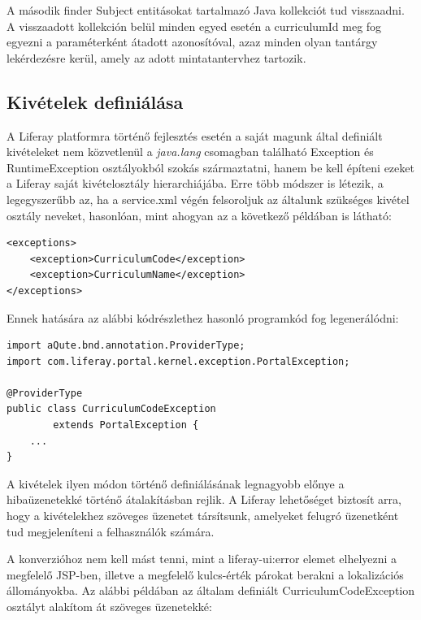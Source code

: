\documentclass[hidelinks, 12pt, a4paper]{report}
\begin{document}
A második finder Subject entitásokat tartalmazó Java kollekciót tud visszaadni. A visszaadott kollekción belül minden egyed esetén a curriculumId meg fog egyezni a paraméterként átadott azonosítóval, azaz minden olyan tantárgy lekérdezésre kerül, amely az adott mintatantervhez tartozik.

\subsection{Kivételek definiálása}

A Liferay platformra történő fejlesztés esetén a saját magunk által definiált kivételeket nem közvetlenül a \emph{java.lang} csomagban található Exception és RuntimeException osztályokból szokás származtatni, hanem be kell építeni ezeket a Liferay saját kivételosztály hierarchiájába. Erre több módszer is létezik, a legegyszerűbb az, ha a service.xml végén felsoroljuk az általunk szükséges kivétel osztály neveket, hasonlóan, mint ahogyan az a következő példában is látható:

\begin{minipage}{\linewidth}
\begin{lstlisting}
<exceptions>
	<exception>CurriculumCode</exception>
	<exception>CurriculumName</exception>
</exceptions>
\end{lstlisting}
\end{minipage}

Ennek hatására az alábbi kódrészlethez hasonló programkód fog legenerálódni:

\begin{minipage}{\linewidth}
\begin{lstlisting}
import aQute.bnd.annotation.ProviderType;
import com.liferay.portal.kernel.exception.PortalException;

@ProviderType
public class CurriculumCodeException
		extends PortalException {
	...
}
\end{lstlisting}
\end{minipage}

A kivételek ilyen módon történő definiálásának legnagyobb előnye a hibaüzenetekké történő átalakításban rejlik. A Liferay lehetőséget biztosít arra, hogy a kivételekhez szöveges üzenetet társítsunk, amelyeket felugró üzenetként tud megjeleníteni a felhasználók számára.

A konverzióhoz nem kell mást tenni, mint a liferay-ui:error elemet elhelyezni a megfelelő JSP-ben, illetve a megfelelő kulcs-érték párokat berakni a lokalizációs állományokba. Az alábbi példában az általam definiált CurriculumCodeException osztályt alakítom át szöveges üzenetekké:
\end{document}
